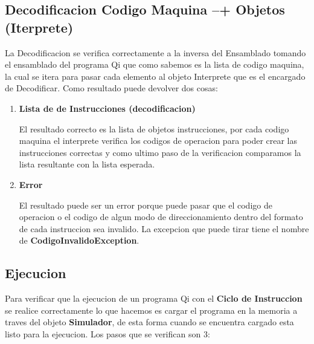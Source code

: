 \subsection{Decodificacion Codigo Maquina --+ Objetos (Iterprete)}
La Decodificacion se verifica correctamente a la inversa del Ensamblado tomando el ensamblado del programa Qi que como sabemos es la lista de codigo maquina, la cual se itera para pasar cada elemento al objeto Interprete que es el encargado de Decodificar. Como resultado puede devolver dos cosas: 
\begin{enumerate}
\item \textbf{Lista de de Instrucciones (decodificacion)} 

El resultado correcto es la lista de objetos instrucciones, por cada codigo maquina el interprete verifica los codigos de operacion para poder crear las instrucciones correctas y como ultimo paso de la verificacion comparamos la lista resultante con la lista esperada.
\item\textbf{Error}

El resultado puede ser un error porque puede pasar que el codigo de operacion o el codigo de algun modo de direccionamiento dentro del formato de cada instruccion sea invalido. La excepcion que puede tirar tiene el nombre de \textbf{CodigoInvalidoException}.   
\end{enumerate}

\subsection{Ejecucion}

Para verificar que la ejecucion de un programa Qi con el \textbf{Ciclo de Instruccion} se realice correctamente lo que hacemos es cargar el programa en la memoria a traves del objeto \textbf{Simulador}, de esta forma cuando se encuentra cargado esta listo para la ejecucion. Los pasos que se verifican son 3:

